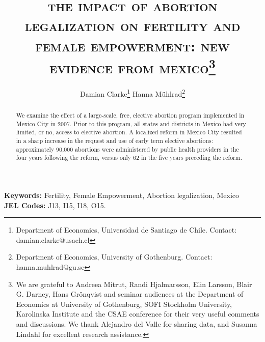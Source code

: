\documentclass[a4paper,11pt]{article}
\title{\textsc{the impact of abortion legalization on fertility and female empowerment: new evidence from mexico}\thanks{We are grateful to Andreea Mitrut, Randi Hjalmarsson, Elin Larsson, Blair G. Darney, Hans Gr\"onqvist and seminar audiences at the Department of Economics at University of Gothenburg,  SOFI Stockholm University, Karolinska Institute and the CSAE conference for their very useful comments and discussions.  We thank Alejandro del Valle for sharing data, and Susanna Lindahl for excellent research assistance.}}
\author{Damian Clarke\thanks{Department of Economics, Universidad de Santiago de Chile.  Contact: damian.clarke@usach.cl} \hspace{1cm} Hanna Mühlrad\thanks{Department of Economics, University of Gothenburg. Contact: hanna.muhlrad@gu.se}}
\begin{document}
\maketitle
{}

\begin{spacing}{1.5}



\begin{abstract}
\noindent We examine the effect of a large-scale, free, elective abortion program implemented in Mexico City in 2007. Prior to this program, all states and districts in Mexico had very limited, or no, access to elective abortion. A localized reform in Mexico City resulted in a sharp increase in the request and use of early term elective abortions: approximately 90,000 abortions were administered by public health providers in the four years following the reform, versus only 62 in the five years preceding the reform. 
\end{abstract}
\textbf{Keywords:} Fertility, Female Empowerment, Abortion legalization, Mexico \\
\noindent \hspace{7mm} \textbf{JEL Codes:} J13, I15, I18, O15. 
\end{spacing}
\end{document}
